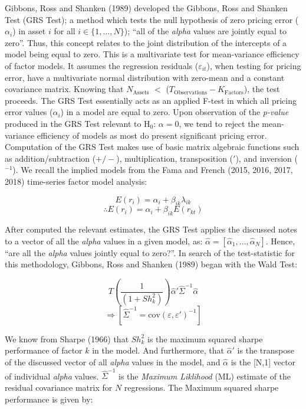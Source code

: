 \documentclass[11pt, english]{article}
\begin{document}
	Gibbons, Ross and Shanken (1989) developed the Gibbons, Ross and Shanken Test (GRS Test); a method which tests the null hypothesis of zero pricing error ($\alpha_i$) in asset $i$ for all $i\in\{1,...,N\}$); ``all of the \textit{alpha} values are jointly equal to zero''. Thus, this concept relates to the joint distribution of the intercepts of a model being equal to zero. This is a multivariate test for mean-variance efficiency of factor models. It assumes the regression residuals ($\varepsilon_{it}$), when testing for pricing error, have a multivariate normal distribution with zero-mean and a constant covariance matrix. Knowing that $N\mathrm{_{Assets}}$ $<$ ($T\mathrm{_{Observations}}-K\mathrm{_{Factors}}$), the test proceeds. The GRS Test essentially acts as an applied F-test in which all pricing error values ($\alpha_i$) in a model are equal to zero. Upon observation of the \textit{p-value} produced in the GRS Test relevant to H$_0$: $\alpha=0$, we tend to reject the mean-variance efficiency of models as most do present significant pricing error.\\

        Computation of the GRS Test makes use of basic matrix algebraic functions such as addition/subtraction ($+/-$), multiplication, transposition ($'$), and inversion ($^{-1}$). We recall the implied models from the Fama and French (2015, 2016, 2017, 2018) time-series factor model analysis:

        $$E(r_i)=\alpha_i+\beta_{ik}\lambda_{ik}$$
        $$\therefore E(r_i)=\alpha_i+\beta_{ik}E(r_{kt})$$

        After computed the relevant estimates, the GRS Test applies the discussed notes to a vector of all the \textit{alpha} values in a given model, as: $\hat{\alpha}=[\hat{\alpha}_1,...,\hat{\alpha}_N]$. Hence, ``are all the \textit{alpha} values jointly equal to zero?''. In search of the test-statistic for this methodology, Gibbons, Ross and Shanken (1989) began with the Wald Test:

        $$T\left(\frac{1}{(1+Sh_k^2)}\right)\hat{\alpha}'\hat{\Sigma}^{-1}\hat{\alpha}$$
        $$\Rightarrow[\hat{\Sigma}^{-1}=\mathrm{cov}(\varepsilon,\varepsilon')^{-1}]$$

        We know from Sharpe (1966) that $Sh_k^2$ is the maximum squared sharpe performance of factor $k$ in the model. And furthermore, that $\hat{\alpha}'$ is the transpose of the discussed vector of all \textit{alpha} values in the model, and $\hat{\alpha}$ is the [N,1] vector of individual \textit{alpha} values. $\hat{\Sigma}^{-1}$ is the \textit{Maximum Liklihood} (ML) estimate of the residual covariance matrix for $N$ regressions. The Maximum squared sharpe performance is given by:
\end{document}
